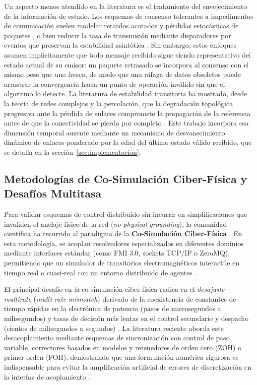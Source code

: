 \noindent Un aspecto menos atendido en la literatura es el tratamiento del envejecimiento de la información de estado. Los esquemas de consenso tolerantes a impedimentos de comunicación suelen modelar retardos acotados y pérdidas estocásticas de paquetes \citep{Olayanju2025ConsensusFreq}, o bien reducir la tasa de transmisión mediante disparadores por eventos que preservan la estabilidad asintótica \citep{Qiu2025, Chen2024}. Sin embargo, estos enfoques asumen implícitamente que todo mensaje recibido sigue siendo representativo del estado actual de su emisor: un paquete retrasado se incorpora al consenso con el mismo peso que uno fresco, de modo que una ráfaga de datos obsoletos puede arrastrar la convergencia hacia un punto de operación inválido sin que el algoritmo lo detecte. La literatura de estabilidad transitoria ha mostrado, desde la teoría de redes complejas y la percolación, que la degradación topológica progresiva ante la pérdida de enlaces compromete la propagación de la referencia antes de que la conectividad se pierda por completo \citep{Machuca2017}. Este trabajo incorpora esa dimensión temporal ausente mediante un mecanismo de desvanecimiento dinámico de enlaces ponderado por la edad del último estado válido recibido, que se detalla en la sección~\ref{sec:implementacion}.

\subsection{Metodologías de Co-Simulación Ciber-Física y Desafíos Multitasa}
Para validar esquemas de control distribuido sin incurrir en simplificaciones que invaliden el anclaje físico de la red (\textit{no physical grounding}), la comunidad científica ha recurrido al paradigma de la \textbf{Co-Simulación Ciber-Física} \citep{Gomes2022FMI30}. En esta metodología, se acoplan resolvedores especializados en diferentes dominios mediante interfaces estándar (como FMI 3.0, sockets TCP/IP o ZeroMQ), permitiendo que un simulador de transitorios electromagnéticos interactúe en tiempo real o cuasi-real con un entorno distribuido de agentes \citep{Muszynski2026EnergyTwin}.

El principal desafío en la co-simulación ciber-física radica en el \textit{desajuste multirate} (\textit{multi-rate mismatch}) derivado de la coexistencia de constantes de tiempo rápidas en la electrónica de potencia (pasos de microsegundos a milisegundos) y tasas de decisión más lentas en el control secundario y despacho (cientos de milisegundos a segundos) \citep{Liu2025Multirate}. La literatura reciente aborda este desacoplamiento mediante esquemas de sincronización con control de paso variable, correctores basados en modelos y retenedores de orden cero (ZOH) o primer orden (FOH), demostrando que una formulación numérica rigurosa es indispensable para evitar la amplificación artificial de errores de discretización en la interfaz de acoplamiento \citep{Haid2022CosimCorrector, Kyllingstad2025CosimErrors}.

